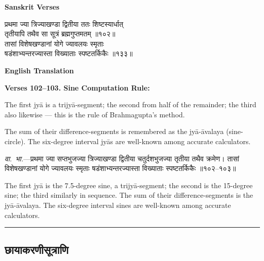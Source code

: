 \documentclass[11pt,a4paper]{article}
\newcommand{\longline}{\noindent\rule{\textwidth}{0.4pt}}
\newcommand{\dev}[1]{{\devanagarifont #1}}
\newcommand{\sectsep}{\par\vspace{0.8em}\longline\vspace{0.8em}}
\begin{document}
\vspace{0.5em}
\begin{minipage}[t]{0.48\textwidth}
\textbf{\small Sanskrit Verses}

\small\devanagarifont
प्रथमा ज्या त्रिज्याखण्डा द्वितीया ततः शिष्टस्यार्धात्\\
तृतीयापि तथैव सा सूत्रं ब्रह्मगुप्तमतम् ॥१०२॥\\[0.5em]
तासां विशेषखण्डानां योगे ज्यावलयः स्मृताः\\
षडंशाभ्यन्तरज्यास्ता विख्याताः स्पष्टतर्किकैः ॥१३३॥
\end{minipage}%
\hfill
\begin{minipage}[t]{0.48\textwidth}
\textbf{\small English Translation}

\textbf{Verses 102--103. Sine Computation Rule:}

The first jy\=a is a trijy\=a-segment; the second from half of the remainder; the third also likewise --- this is the rule of Brahmagupta's method.

The sum of their difference-segments is remembered as the jy\=a-\=avalaya (sine-circle). The six-degree interval jy\=as are well-known among accurate calculators.
\end{minipage}

\vspace{0.5em}
\begin{minipage}[t]{0.48\textwidth}
\small\devanagarifont
\textit{वा.~भा.}---प्रथमा ज्या सप्तभुजज्या त्रिज्याखण्डा द्वितीया चतुर्दशभुजज्या तृतीया तथैव क्रमेण। तासां विशेषखण्डानां योगे ज्यावलयः स्मृताः षडंशाभ्यन्तरज्यास्ता विख्याताः स्पष्टतर्किकैः ॥१०२--१०३॥
\end{minipage}%
\hfill
\begin{minipage}[t]{0.48\textwidth}
\small
The first jy\=a is the 7.5-degree sine, a trijy\=a-segment; the second is the 15-degree sine; the third similarly in sequence. The sum of their difference-segments is the jy\=a-\=avalaya. The six-degree interval sines are well-known among accurate calculators.
\end{minipage}

\sectsep

\subsection{\dev{छायाकरणीसूत्राणि}}
\end{document}
